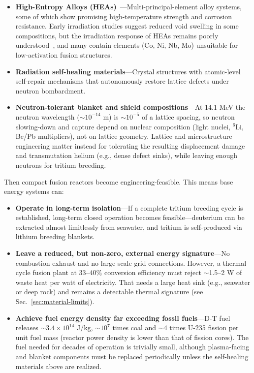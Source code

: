 \documentclass[aps,prd,twocolumn,superscriptaddress,nofootinbib]{revtex4-2}
\begin{document}
\begin{itemize}
  \item \textbf{High-Entropy Alloys (HEAs)}~\cite{Miracle2017}---Multi-principal-element alloy systems, some of which show promising high-temperature strength and corrosion resistance. Early irradiation studies suggest reduced void swelling in some compositions, but the irradiation response of HEAs remains poorly understood~\cite{Pickering2021}, and many contain elements (Co, Ni, Nb, Mo) unsuitable for low-activation fusion structures.
  \item \textbf{Radiation self-healing materials}---Crystal structures with atomic-level self-repair mechanisms that autonomously restore lattice defects under neutron bombardment.
  \item \textbf{Neutron-tolerant blanket and shield compositions}---At 14.1 MeV the neutron wavelength (${\sim}10^{-14}$ m) is ${\sim}10^{-5}$ of a lattice spacing, so neutron slowing-down and capture depend on nuclear composition (light nuclei, ${}^{6}$Li, Be/Pb multipliers), not on lattice geometry. Lattice and microstructure engineering matter instead for tolerating the resulting displacement damage and transmutation helium (e.g., dense defect sinks), while leaving enough neutrons for tritium breeding.
\end{itemize}

Then compact fusion reactors become engineering-feasible. This means base energy systems can:

\begin{itemize}
  \item \textbf{Operate in long-term isolation}---If a complete tritium breeding cycle is established, long-term closed operation becomes feasible---deuterium can be extracted almost limitlessly from seawater, and tritium is self-produced via lithium breeding blankets.
  \item \textbf{Leave a reduced, but non-zero, external energy signature}---No combustion exhaust and no large-scale grid connections. However, a thermal-cycle fusion plant at 33--40\% conversion efficiency must reject ${\sim}$1.5--2 W of waste heat per watt of electricity. That needs a large heat sink (e.g., seawater or deep rock) and remains a detectable thermal signature (see Sec.~\ref{sec:material-limits}).
  \item \textbf{Achieve fuel energy density far exceeding fossil fuels}---D-T fuel releases ${\sim}3.4\times10^{14}$ J/kg, ${\sim}10^{7}$ times coal and ${\sim}$4 times U-235 fission per unit fuel mass (reactor power density is lower than that of fission cores). The fuel needed for decades of operation is trivially small, although plasma-facing and blanket components must be replaced periodically unless the self-healing materials above are realized.
\end{itemize}
\end{document}
